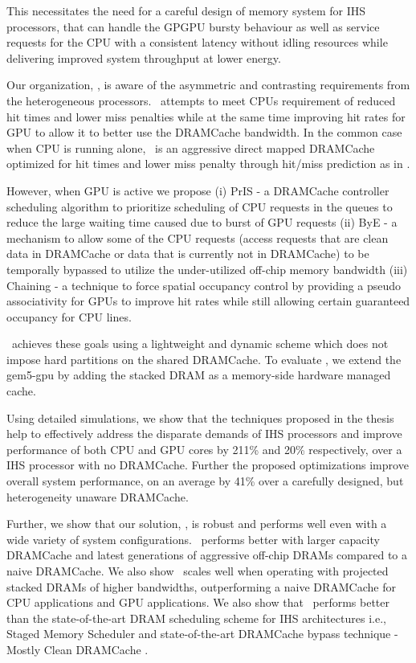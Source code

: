 This necessitates the need for a careful design of memory system for IHS processors, that can handle the GPGPU bursty behaviour as well as service requests for the CPU with a consistent latency without idling resources while delivering improved system throughput at lower energy.
\par Our organization, \cachename, is aware of the asymmetric and contrasting requirements from the heterogeneous processors. \cachename\ attempts to meet CPUs requirement of reduced hit times and lower miss penalties while at the same time improving hit rates for GPU to allow it to better use the DRAMCache bandwidth. In the common case when CPU is running alone, \cachename\ is an aggressive direct mapped DRAMCache optimized for hit times and lower miss penalty through hit/miss prediction as in \cite{alloy}. 

\par However, when GPU is active we propose (i) PrIS - a DRAMCache controller scheduling algorithm to prioritize scheduling of CPU requests in the queues to reduce the large waiting time caused due to burst of GPU requests (ii) ByE - a mechanism to allow some of the CPU requests (access requests that are clean data in DRAMCache or data that is currently not in DRAMCache) to be temporally bypassed to utilize the under-utilized off-chip memory bandwidth (iii) Chaining - a technique to force spatial occupancy control by providing a pseudo associativity for GPUs to improve hit rates while still allowing certain guaranteed occupancy for CPU lines.

\cachename\ achieves these goals using a lightweight and dynamic scheme which does not impose hard partitions on the shared DRAMCache. To evaluate
\cachename, we extend the gem5-gpu \cite{gem5-gpu} by adding the stacked DRAM as a memory-side hardware managed cache.

Using detailed simulations, we show that the techniques proposed in the thesis  help to effectively address the disparate demands of IHS
processors and improve performance of both CPU and GPU cores by 211\% and 20\% respectively, over a IHS processor with no DRAMCache.  Further the proposed optimizations improve overall system performance, on an average by 41\% over a carefully designed, but heterogeneity unaware DRAMCache. 
\par Further, we show that our solution, \cachename, is robust and performs well even with a wide variety of system configurations. \cachename\ performs better with larger capacity DRAMCache and latest generations of aggressive off-chip DRAMs compared to a naive DRAMCache. We also show \cachename\ scales well when operating with projected stacked DRAMs of higher bandwidths, outperforming a naive DRAMCache for CPU applications and GPU applications.
We also show that \cachename\ performs better than the state-of-the-art DRAM scheduling scheme for IHS architectures i.e., Staged Memory Scheduler \cite{sms} and state-of-the-art DRAMCache bypass technique - Mostly Clean DRAMCache \cite{mostly-clean}.

